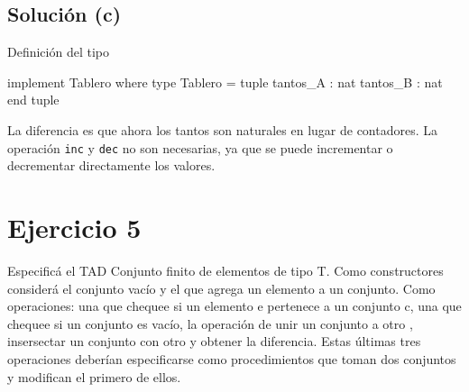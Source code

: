 \subsection{Solución (c)}
\begin{codebox}{Definición del tipo}
\begin{pascallike}
implement Tablero where
type Tablero = tuple
                  tantos_A : nat
                  tantos_B : nat
              end tuple
\end{pascallike}
\end{codebox}
La diferencia es que ahora los tantos son naturales en lugar de contadores. La operación \texttt{inc} y \texttt{dec} no son necesarias, ya que se puede incrementar o decrementar directamente los valores.

\section{Ejercicio 5}
Especificá el TAD Conjunto finito de elementos de tipo T. Como constructores considerá el conjunto vacío y el que agrega un elemento a un conjunto. Como operaciones: una que chequee si un elemento e pertenece a un conjunto c, una que chequee si un conjunto es vacío, la operación de unir un conjunto a otro , insersectar un conjunto con otro y obtener la diferencia. Estas últimas tres operaciones deberían especificarse como procedimientos que toman dos conjuntos y modifican el primero de ellos.


